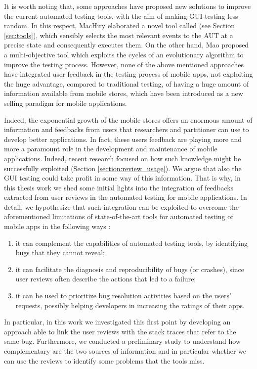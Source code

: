 It is worth noting that, some approaches \cite{sapienz, dynodroid} have proposed new solutions to improve the current automated testing tools, with the aim of making GUI-testing less random. 
In this respect, MacHiry \etal \cite{dynodroid} elaborated a novel tool called \dynodroid (see Section \ref{sec:tools}), which sensibly selects the most relevant events to the AUT at a precise state and consequently executes them. 
On the other hand, Mao \etal \cite{sapienz} proposed a multi-objective tool which exploits the cycles of an  evolutionary algorithm to improve the testing process. 
However, none of the above mentioned approaches have integrated user feedback in the testing process of mobile apps, not exploiting the huge advantage, compared to traditional testing, of having a huge amount of information available from mobile stores, which have been introduced as a new selling paradigm for mobile applications.


Indeed, the exponential growth of the mobile stores offers an enormous amount of information and feedbacks from users that researchers and partitioner can use to develop better applications. In fact, these users feedback are playing more and more a paramount role in the development and maintenance of mobile applications. Indeed, recent research focused on how such knowledge might be successfully exploited (Section \ref{section:review_usage}). 
We argue that also the GUI testing could take profit in some way of this information. That is why, in this thesis work we shed some initial lights into the integration of feedbacks extracted from user reviews in the automated testing for mobile applications.
In detail, we hypothesize that such integration can be exploited to overcome the aforementioned limitations of state-of-the-art tools for automated testing of mobile apps in the following ways \cite{cristal}: 
\begin{enumerate}
\item it can complement the capabilities of automated testing tools, by identifying bugs that they cannot reveal; 
\item it can facilitate the diagnosis and reproducibility of bugs (or crashes), since user reviews often describe the actions that led to a failure; 
\item it can be used to prioritize bug resolution activities based on the users' requests, possibly helping developers in increasing the ratings of their apps.
\end{enumerate} 
In particular, in this work we investigated this first point by developing an approach able to link the user reviews with the stack traces that refer to the same bug. Furthermore, we conducted a preliminary study to understand how complementary are the two sources of information and in particular whether we can use the reviews to identify some problems that the tools miss. 

